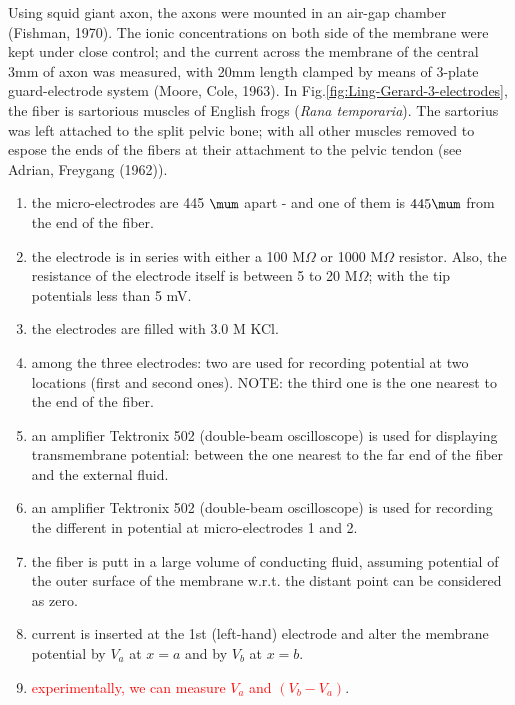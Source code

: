 Using squid giant axon, the axons were mounted in an air-gap chamber (Fishman,
1970). The ionic concentrations on both side of the membrane were kept under
close control; and the current across the membrane of the central 3mm of axon
was measured, with 20mm length clamped by means of 3-plate guard-electrode
system (Moore, Cole, 1963). In Fig.\ref{fig:Ling-Gerard-3-electrodes}, the fiber
is sartorious muscles of English frogs ({\it Rana temporaria}). The sartorius
was left attached to the split pelvic bone; with all other muscles removed to
espose the ends of the fibers at their attachment to the pelvic tendon (see
Adrian, Freygang (1962)).
\begin{enumerate}
  \item the micro-electrodes are 445 $\mum$ apart - and one of them is $445\mum$
  from the end of the fiber.

  \item the electrode is in series with either a 100 M$\Omega$ or 1000 M$\Omega$
  resistor. Also, the resistance of the electrode itself is between 5 to 20
  M$\Omega$; with the tip potentials less than 5 mV.

  \item the electrodes are filled with 3.0 M KCl.

  \item among the three electrodes: two are used for recording potential
  at two locations (first and second ones). NOTE: the third one is the one
  nearest to the end of the fiber.

  \item an amplifier Tektronix 502 (double-beam oscilloscope) is used for
  displaying transmembrane potential: between the one nearest to the far end of
  the fiber and the external fluid.

  \item an amplifier Tektronix 502 (double-beam oscilloscope) is used for
  recording the different in potential at micro-electrodes 1 and 2.

  \item the fiber is putt in a large volume of conducting fluid, assuming
  potential of the outer surface of the membrane w.r.t. the distant point can be
  considered as zero.

  \item current is inserted at the 1st (left-hand) electrode and alter the
  membrane potential by $V_a$ at $x=a$ and by $V_b$ at $x=b$.

  \item \textcolor{red}{experimentally, we can measure $V_a$ and $(V_b - V_a)$}.

\end{enumerate}


